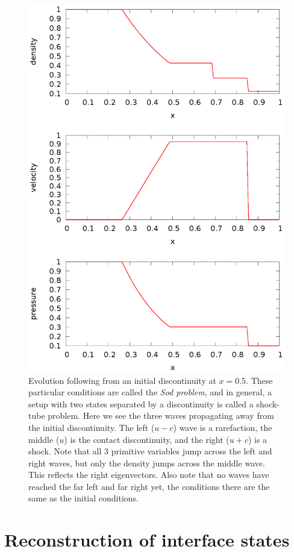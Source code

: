 \begin{figure}
\centering
\includegraphics[width=0.85\linewidth]{sod}
\caption[The Sod problem.]{\label{fig:sod} Evolution following from an initial
  discontinuity at $x = 0.5$.  These particular conditions are called
  the {\em Sod problem}, and in general, a setup with two states
  separated by a discontinuity is called a shock-tube problem.  Here
  we see the three waves propagating away from the initial
  discontinuity.  The left ($u-c$) wave is a rarefaction, the middle
  ($u$) is the contact discontinuity, and the right ($u+c$) is a
  shock. Note that all 3 primitive variables jump across the left and
  right waves, but only the density jumps across the middle wave.
  This reflects the right eigenvectors.  Also note that no waves have
  reached the far left and far right yet, the conditions there are the
  same as the initial conditions.}
\end{figure}


\section{Reconstruction of interface states}

